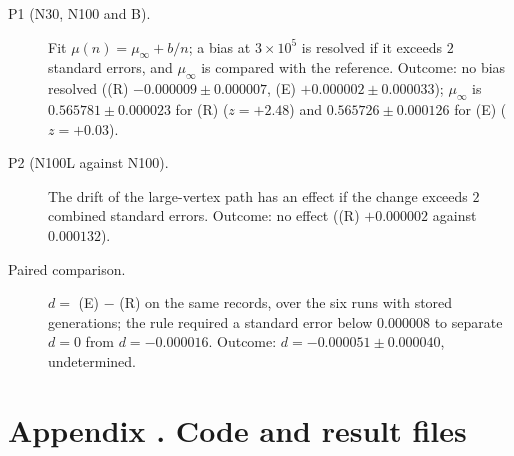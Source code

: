 \documentclass[11pt]{article}
\theoremstyle{plain}
\theoremstyle{definition}
\theoremstyle{remark}
\begin{document}
\begin{description}
\item[P1 (N30, N100 and B).] Fit $\mu(n)=\mu_\infty+b/n$; a bias at $3\times10^5$ is resolved if it exceeds $2$ standard errors, and $\mu_\infty$ is compared with the reference. Outcome: no bias resolved ((R) $-0.000009\pm0.000007$, (E) $+0.000002\pm0.000033$); $\mu_\infty$ is $0.565781\pm0.000023$ for (R) ($z=+2.48$) and $0.565726\pm0.000126$ for (E) ($z=+0.03$).
\item[P2 (N100L against N100).] The drift of the large-vertex path has an effect if the change exceeds $2$ combined standard errors. Outcome: no effect ((R) $+0.000002$ against $0.000132$).
\item[Paired comparison.] $d=$ (E) $-$ (R) on the same records, over the six runs with stored generations; the rule required a standard error below $0.000008$ to separate $d=0$ from $d=-0.000016$. Outcome: $d=-0.000051\pm0.000040$, undetermined.
\end{description}

\section*{Appendix \thesection. Code and result files}\label{app:files}
\end{document}

